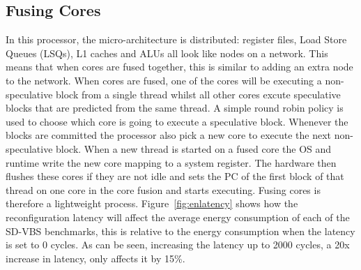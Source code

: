 \subsection{Fusing Cores}
In this processor, the micro-architecture is distributed: register files, Load Store Queues (LSQs), L1 caches and ALUs all look like nodes on a network.
This means that when cores are fused together, this is similar to adding an extra node to the network.
When cores are fused, one of the cores will be executing a non-speculative block from a single thread whilst all other cores excute speculative blocks that are predicted from the same thread.
A simple round robin policy is used to choose which core is going to execute a speculative block.
Whenever the blocks are committed the processor also pick a new core to execute the next non-speculative block.
When a new thread is started on a fused core the OS and runtime write the new core mapping to a system register.
The hardware then flushes these cores if they are not idle and sets the PC of the first block of that thread on one core in the core fusion and starts executing.
Fusing cores is therefore a lightweight process.
Figure~\ref{fig:enlatency} shows how the reconfiguration latency will affect the average energy consumption of each of the SD-VBS benchmarks, this is relative to the energy consumption when the latency is set to 0 cycles.
As can be seen, increasing the latency up to 2000 cycles, a 20x increase in latency, only affects it by 15\%.
%
%
%
